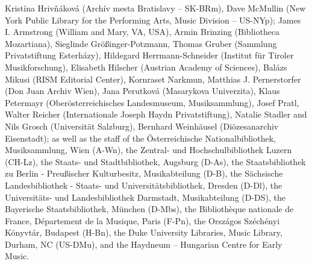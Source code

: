 \documentclass{ees}
\begin{document}
Kristína Hrivňáková (Archív mesta Bratislavy – SK-BRm),
Dave McMullin (New York Public Library for the Performing Arts, Music Division – US-NYp);
James I. Armstrong (William and Mary, VA, USA),
Armin Brinzing (Bibliotheca Mozartiana),
Sieglinde Größinger-Potzmann,
Thomas Gruber (Sammlung Privatstiftung Esterházy),
Hildegard Herrmann-Schneider (Institut für Tiroler Musikforschung),
Elisabeth Hilscher (Austrian Academy of Sciences),
Balázs Mikusi (RISM Editorial Center),
Kornraset Narkmun,
Matthias J. Pernerstorfer (Don Juan Archiv Wien),
Jana Perutková (Masarykova Univerzita),
Klaus Petermayr (Oberösterreichisches Landesmuseum, Musiksammlung),
Josef Pratl,
Walter Reicher (Internationale Joseph Haydn Privatstiftung),
Natalie Stadler and Nils Grosch (Universität Salzburg),
Bernhard Weinhäusel (Diözesanarchiv Eisenstadt);
as well as the staff of
the Österreichische Nationalbibliothek, Musiksammlung, Wien (A-Wn),
the Zentral- und Hochschulbibliothek Luzern (CH-Lz),
the Staats- und Stadtbibliothek, Augsburg (D-As),
the Staatsbibliothek zu Berlin - Preußischer Kulturbesitz, Musikabteilung (D-B),
the Sächsische Landesbibliothek - Staats- und Universitätsbibliothek, Dresden (D-Dl),
the Universitäts- und Landesbibliothek Darmstadt, Musikabteilung (D-DS),
the Bayerische Staatsbibliothek, München (D-Mbs),
the Bibliothèque nationale de France, Département de la Musique, Paris (F-Pn),
the Országos Széchényi Könyvtár, Budapest (H-Bn),
the Duke University Libraries, Music Library, Durham, NC (US-DMu),
and the Haydneum – Hungarian Centre for Early Music.


\clearpage
{}
\end{document}
